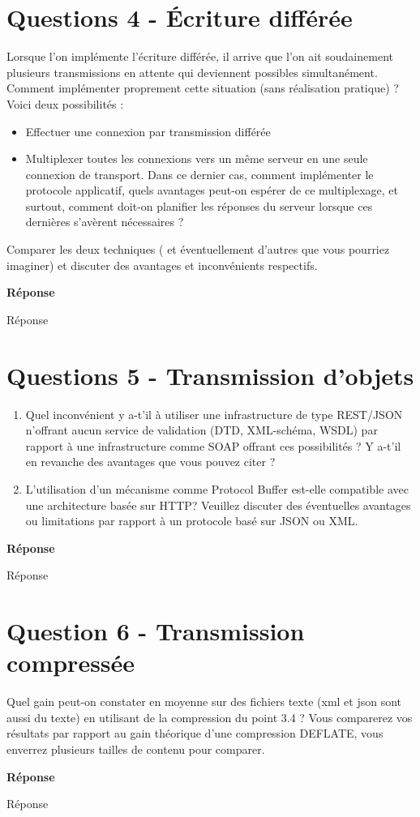 \documentclass[francais,12pt]{article}
\begin{document}
	\section*{Questions 4 - Écriture différée}    
	Lorsque l'on implémente l'écriture différée, il arrive que l'on ait soudainement plusieurs transmissions en attente qui deviennent possibles simultanément. Comment implémenter proprement cette situation (sans réalisation pratique) ? Voici deux possibilités :
	\begin{itemize}
		\item Effectuer une connexion par transmission différée
		\item Multiplexer toutes les connexions vers un même serveur en une seule connexion de transport. Dans ce dernier cas, comment implémenter le protocole applicatif, quels avantages peut-on espérer de ce multiplexage, et surtout, comment doit-on planifier les réponses du serveur lorsque ces dernières s'avèrent nécessaires ?
	\end{itemize}
	
	Comparer les deux techniques ( et éventuellement d'autres que vous pourriez imaginer) et discuter des avantages et inconvénients respectifs.
	
	{\color[rgb]{0,0.5,0.23}\textbf{Réponse}}
	
	Réponse
	
	
	\section*{Questions 5 - Transmission d'objets}  
	\begin{enumerate}
		\item Quel inconvénient y a-t'il à utiliser une infrastructure de type REST/JSON n'offrant aucun service de validation (DTD, XML-schéma, WSDL) par rapport à une infrastructure comme SOAP offrant ces possibilités ? Y a-t'il en revanche des avantages que vous pouvez citer ?
		\item L'utilisation d'un mécanisme comme Protocol Buffer est-elle compatible avec une architecture basée sur HTTP? Veuillez discuter des éventuelles avantages ou limitations par rapport à un protocole basé sur JSON ou XML.
	\end{enumerate} 
	
	{\color[rgb]{0,0.5,0.23}\textbf{Réponse}}
	
	Réponse
	
	\section*{Question 6 - Transmission compressée}
	Quel gain peut-on constater en moyenne sur des fichiers texte (xml et json sont aussi du texte) en utilisant de la compression du point 3.4 ? Vous comparerez vos résultats par rapport au gain théorique d'une compression DEFLATE, vous enverrez plusieurs tailles de contenu pour comparer.
	
	{\color[rgb]{0,0.5,0.23}\textbf{Réponse}}
	
	Réponse
	
	
\end{document}

